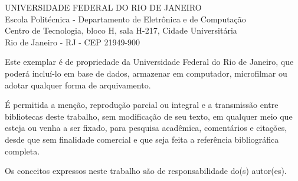 \pagebreak
\pagestyle{plain}

\noindent
UNIVERSIDADE FEDERAL DO RIO DE JANEIRO\\
Escola Politécnica - Departamento de Eletrônica e de Computação\\
Centro de Tecnologia, bloco H, sala H-217, Cidade Universitária\\
Rio de Janeiro - RJ - CEP 21949-900

\vspace{0.5cm}
Este exemplar é de propriedade da Universidade Federal do Rio de Janeiro, que poderá incluí-lo em base de dados, armazenar em computador, microfilmar ou adotar qualquer forma de arquivamento.

É permitida a menção, reprodução parcial ou integral e a transmissão entre bibliotecas deste trabalho, sem modificação de seu texto, em qualquer meio que esteja ou venha a ser fixado, para pesquisa acadêmica, comentários e citações, desde que sem finalidade comercial e que seja feita a referência bibliográfica completa.

Os conceitos expressos neste trabalho são de responsabilidade do(s) autor(es).